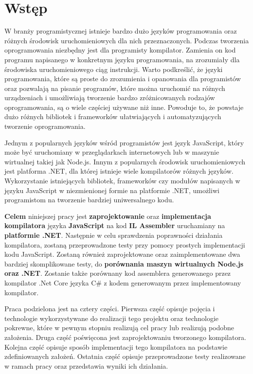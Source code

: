 %


\chapter*{Wstęp}

\par W branży programistycznej istnieje bardzo dużo języków programowania oraz różnych środowisk uruchomieniowych dla nich przeznaczonych. Podczas tworzenia oprogramowania niezbędny jest dla programisty kompilator. Zamienia on kod programu napisanego w konkretnym języku programowania, na zrozumiały dla środowiska uruchomieniowego ciąg instrukcji. Warto podkreślić, że języki programowania, które są proste do zrozumienia i opanowania dla programistów oraz pozwalają na pisanie programów, które można uruchomić na różnych urządzeniach i umożliwiają tworzenie bardzo zróżnicowanych rodzajów oprogramowania, są o wiele częściej używane niż inne. Powoduje to, że powstaje dużo różnych bibliotek i frameworków ułatwiających i automatyzujących tworzenie oprogramowania.

\par Jednym z popularnych języków wśród programistów jest język JavaScript, który może być uruchomiany w przeglądarkach internetowych lub w maszynie wirtualnej takiej jak Node.js. Innym z popularnych środowisk uruchomieniowych jest platforma .NET, dla której istnieje wiele kompilatorów różnych języków. Wykorzystanie istniejących bibliotek, frameworków czy modułów napisanych w języku JavaScript w niezmienionej formie na platformie .NET, umożliwi programistom na tworzenie bardziej uniwersalnego kodu.

\par \textbf{Celem} niniejszej pracy jest \textbf{zaprojektowanie} oraz \textbf{implementacja kompilatora} języka \textbf{JavaScript} na kod \textbf{IL Assembler} uruchamiany na \textbf{platformie .NET}. Następnie w celu sprawdzenia poprawności działania kompilatora, zostaną przeprowadzone testy przy pomocy prostych implementacji kodu JavaScript. Zostaną również zaprojektowane oraz zaimplementowane dwa bardziej skomplikowane testy, do \textbf{porównania maszyn wirtualnych Node.js oraz .NET}. Zostanie także porównany kod assemblera generowanego przez kompilator .Net Core języka C\# z kodem generowanym przez implementowany kompilator.

\par Praca podzielona jest na cztery części. Pierwsza część opisuje pojęcia i technologie wykorzystywane do realizacji tego projektu oraz technologie pokrewne, które w pewnym stopniu realizują cel pracy lub realizują podobne założenia. Druga część poświęcona jest zaprojektowaniu tworzonego kompilatora. Kolejna część opisuje sposób implementacji tego kompilatora na podstawie zdefiniowanych założeń. Ostatnia część opisuje przeprowadzone testy realizowane w ramach pracy oraz przedstawia wyniki ich działania.
